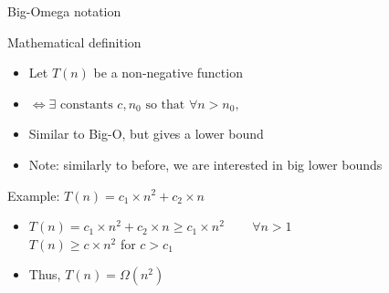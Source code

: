 \begin{frame}{Big-Omega notation}
  \begin{block}{Mathematical definition}
    \begin{itemize}
    \item Let $T(n)$ be a non-negative function
    \item {} 
      $\Leftrightarrow \exists \text{ constants } c, n_0 
      \text{ so that } \forall n>n_0,$ 
    \item Similar to Big-O, but gives a \alert{lower} bound
    \item Note: similarly to before, we are interested in big lower bounds
    \end{itemize}
  \end{block}

  \begin{block}{Example: $T(n)=c_1\times n^2+c_2\times n$}
    \begin{itemize}
    \item $T(n)=c_1\times n^2+c_2\times n\ge c_1\times n^2$ ~~~ $\forall n>1$\\
      $T(n)\ge c\times n^2$ for $c>c_1$
    \item Thus, $T(n)=\Omega(n^2)$
    \end{itemize}
  \end{block}
\end{frame}
